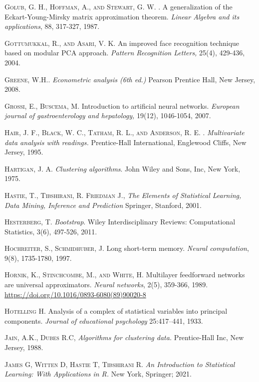 \begin{thebibliography}{99}
\textsc{Golub, G. H., Hoffman, A., and Stewart, G. W. }. A generalization of the Eckart-Young-Mirsky matrix approximation theorem. \emph{Linear Algebra and its applications}, 88, 317-327, 1987. 

 \textsc{Gottumukkal, R., and Asari, V. K. } An improved face recognition technique based on modular PCA approach.\emph{ Pattern Recognition Letters,} 25(4), 429-436, 2004.

\textsc{Greene,  W.H.}. \emph{Econometric analysis (6th ed.)} Pearson Prentice Hall, New Jersey, 2008.

\textsc{Grossi, E.,  Buscema, M.  }Introduction to artificial neural networks. \emph{European journal of gastroenterology and hepatology,} 19(12), 1046-1054, 2007.

\textsc{Hair, J. F., Black, W. C., Tatham, R. L., and Anderson, R. E. .}
\textit{ Multivariate data analysis with readings.} Prentice-Hall International, Englewood Cliffs, New Jersey, 1995.

\textsc{Hartigan, J. A. }\emph{ Clustering algorithms}. John Wiley and Sons, Inc, New York, 1975. 

 \textsc{Hastie, T., Tibshirani, R. Friedman J.}, \textit{The Elements of Statistical Learning, Data Mining, Inference and Prediction} Springer, Stanford, 2001.

\textsc{Hesterberg, T.} \emph{Bootstrap}. Wiley Interdisciplinary Reviews: Computational Statistics, 3(6), 497-526, 2011.

\textsc{Hochreiter, S.,  Schmidhuber, J. } Long short-term memory.\emph{ Neural computation}, 9(8), 1735-1780, 1997.

 \textsc{Hornik, K., Stinchcombe, M., and White, H. } Multilayer feedforward networks are universal approximators. \emph{Neural networks}, 2(5), 359-366, 1989.
\url{https://doi.org/10.1016/0893-6080(89)90020-8}

\textsc{Hotelling H. } Analysis of a complex of statistical variables
into principal components. \emph{ Journal of educational psychology }
25:417–441, 1933.

 \textsc{Jain, A.K., Dubes R.C,} \textit{Algorithms for clustering data.} Prentice-Hall Inc, New Jersey,  1988.

\textsc{James G, Witten D, Hastie T, Tibshirani R.} \emph{An Introduction to Statistical Learning: With Applications in R.} New York, Springer; 2021. 


\end{thebibliography}
